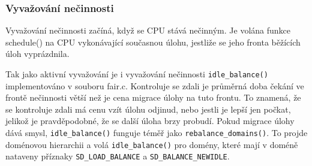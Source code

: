 \documentclass[a4paper,12pt]{article}
\begin{document}
%
%

\subsubsection{Vyvažování nečinnosti}

Vyvažování nečinnosti začíná, když se CPU stává nečinným. Je volána funkce schedule() na CPU vykonávající současnou úlohu, jestliže se jeho fronta běžících úloh vyprázdnila.

Tak jako aktivní vyvažování je i vyvažování nečinnosti \verb#idle_balance()# implementováno v souboru fair.c. Kontroluje se zdali je průměrná doba čekání ve frontě nečinnosti větší než je cena migrace úlohy na tuto frontu. To znamená, že se kontroluje zdali má cenu vzít úlohu odjinud, nebo jestli je lepší jen počkat, jelikož je pravděpodobné, že se další úloha brzy probudí. Pokud migrace úlohy dává smysl, \verb#idle_balance()# funguje téměř jako \verb#rebalance_domains()#. To projde doménovou hierarchii a volá \verb#idle_balance()# pro domény, které mají v doméně nataveny příznaky \verb#SD_LOAD_BALANCE# a \verb#SD_BALANCE_NEWIDLE#.
\end{document}
